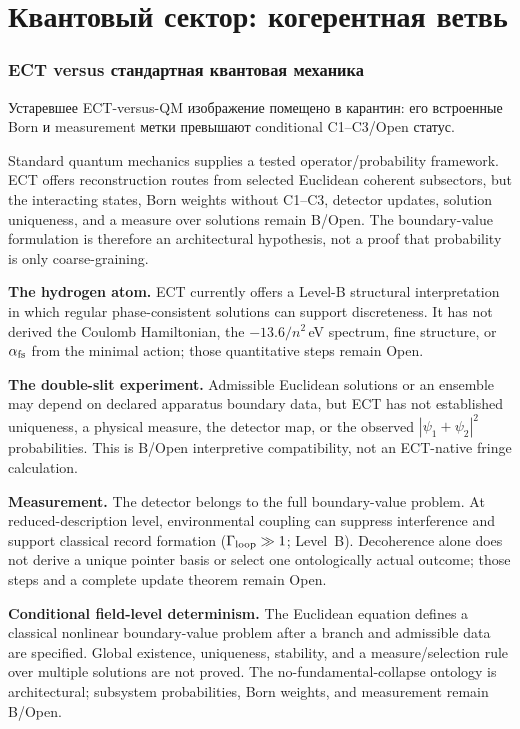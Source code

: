 \documentclass[11pt,a4paper]{article}
\begin{document}
\part{Квантовый сектор: когерентная ветвь}
\label{part:quantum_pop}


\section{ECT versus стандартная квантовая механика}
\label{sec:pop_ect_vs_qm}

Устаревшее ECT-versus-QM изображение помещено в карантин: его встроенные Born и measurement метки превышают conditional C1--C3/Open статус.

Standard quantum mechanics supplies a tested operator/probability
framework. ECT offers reconstruction routes from selected Euclidean coherent
subsectors, but the interacting states, Born weights without C1--C3, detector
updates, solution uniqueness, and a measure over solutions remain B/Open. The
boundary-value formulation is therefore an architectural hypothesis, not a
proof that probability is only coarse-graining.

\textbf{The hydrogen atom.} ECT currently offers a Level-B structural interpretation in which regular phase-consistent solutions can support discreteness. It has not derived the Coulomb Hamiltonian, the $-13.6/n^2$\,eV spectrum, fine structure, or $\alpha_{\rm fs}$ from the minimal action; those quantitative steps remain Open.

\textbf{The double-slit experiment.} Admissible Euclidean solutions or an ensemble may depend on declared apparatus boundary data, but ECT has not established uniqueness, a physical measure, the detector map, or the observed $|\psi_1+\psi_2|^2$ probabilities. This is B/Open interpretive compatibility, not an ECT-native fringe calculation.

\textbf{Measurement.} The detector belongs to the full boundary-value problem.  At reduced-description level, environmental coupling can suppress interference and support classical record formation ($\Gamma_{\rm loop}\gg1$; Level~B).  Decoherence alone does not derive a unique pointer basis or select one ontologically actual outcome; those steps and a complete update theorem remain Open.

\textbf{Conditional field-level determinism.} The Euclidean equation defines a classical nonlinear boundary-value problem after a branch and admissible data are specified. Global existence, uniqueness, stability, and a measure/selection rule over multiple solutions are not proved. The no-fundamental-collapse ontology is architectural; subsystem probabilities, Born weights, and measurement remain B/Open.
\end{document}
